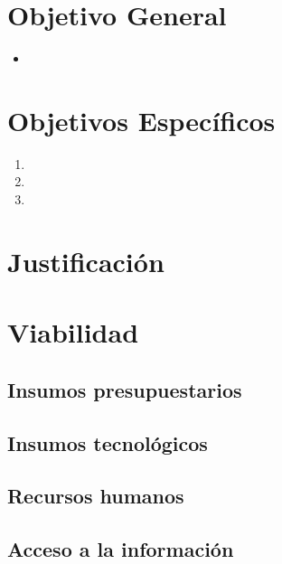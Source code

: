 \lipsum[1-3]

\section{Objetivo General}
\begin{itemize}
    \item \lipsum[10][1-4]
\end{itemize}

\section{Objetivos Específicos}
\begin{enumerate}
    \item \lipsum[10][4-6] 
    \item \lipsum[10][7-11] 
    \item \lipsum[10][10-12]
\end{enumerate}

\section{Justificación}

\lipsum[1-3]

\section{Viabilidad}

\lipsum[5]  

\subsection{Insumos presupuestarios}

\lipsum[5]

\subsection{Insumos tecnológicos}

\lipsum[5]

\subsection{Recursos humanos}

\lipsum[5]

\subsection{Acceso a la información}

